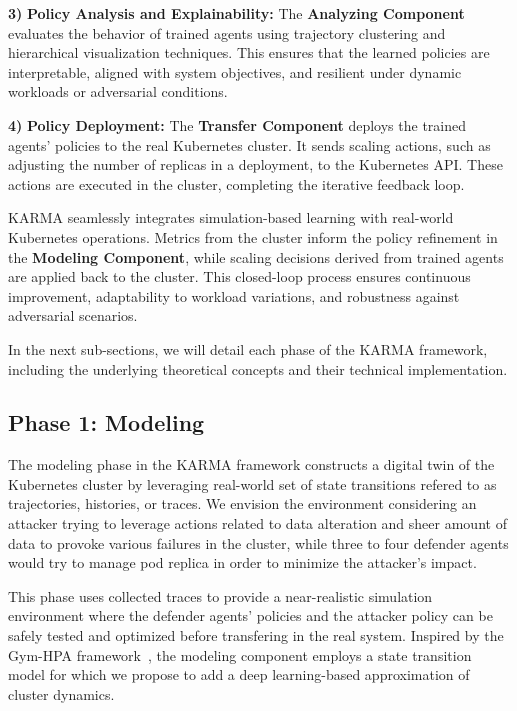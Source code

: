 \documentclass[conference]{IEEEtran}
\begin{document}
\textbf{3)} \textbf{Policy Analysis and Explainability:} The \textbf{Analyzing Component} evaluates the behavior of trained agents using trajectory clustering and hierarchical visualization techniques. This ensures that the learned policies are interpretable, aligned with system objectives, and resilient under dynamic workloads or adversarial conditions.
    
\textbf{4)} \textbf{Policy Deployment:} The \textbf{Transfer Component} deploys the trained agents' policies to the real Kubernetes cluster. It sends scaling actions, such as adjusting the number of replicas in a deployment, to the Kubernetes API. These actions are executed in the cluster, completing the iterative feedback loop.

KARMA seamlessly integrates simulation-based learning with real-world Kubernetes operations. Metrics from the cluster inform the policy refinement in the \textbf{Modeling Component}, while scaling decisions derived from trained agents are applied back to the cluster. This closed-loop process ensures continuous improvement, adaptability to workload variations, and robustness against adversarial scenarios.

In the next sub-sections, we will detail each phase of the KARMA framework, including the underlying theoretical concepts and their technical implementation.

\subsection{Phase 1: Modeling}

The modeling phase in the KARMA framework constructs a digital twin of the Kubernetes cluster by leveraging real-world set of state transitions refered to as trajectories, histories, or traces. We envision the environment considering an attacker trying to leverage actions related to data alteration and sheer amount of data to provoke various failures in the cluster, while three to four defender agents would try to manage pod replica in order to minimize the attacker's impact.

This phase uses collected traces to provide a near-realistic simulation environment where the defender agents' policies and the attacker policy can be safely tested and optimized before transfering in the real system. Inspired by the Gym-HPA framework~\cite{GymHPA}, the modeling component employs a state transition model for which we propose to add a deep learning-based approximation of cluster dynamics.
\end{document}

